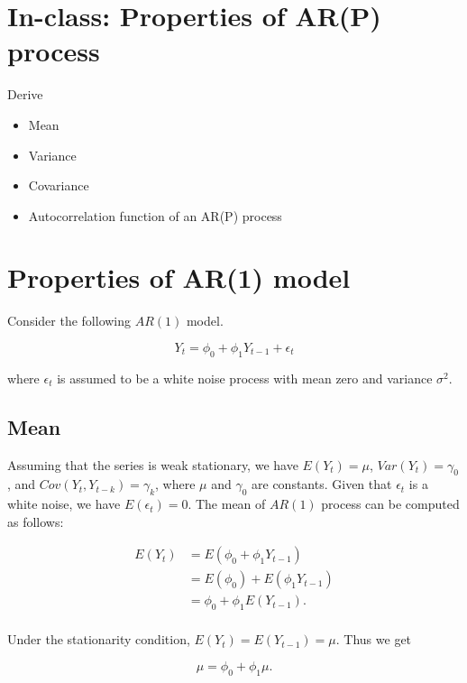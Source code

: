 \documentclass[
  11pt,
  a4paper,
]{report}
\begin{document}
\section{In-class: Properties of AR(P)
process}\label{in-class-properties-of-arp-process}

Derive

\begin{itemize}
\item
  Mean
\item
  Variance
\item
  Covariance
\item
  Autocorrelation function of an AR(P) process
\end{itemize}

\section{Properties of AR(1) model}\label{properties-of-ar1-model}

Consider the following \(AR(1)\) model.

\begin{equation}
Y_t=\phi_0+\phi_1Y_{t-1}+\epsilon_{t}
\end{equation}

where \({\epsilon_t}\) is assumed to be a white noise process with mean
zero and variance \(\sigma^2\).

\subsection{Mean}\label{mean}

Assuming that the series is weak stationary, we have \(E(Y_t)=\mu\),
\(Var(Y_t)=\gamma_0\), and \(Cov(Y_t, Y_{t-k})=\gamma_k\), where \(\mu\)
and \(\gamma_0\) are constants. Given that \({\epsilon_t}\) is a white
noise, we have \(E(\epsilon_t)=0\). The mean of \(AR(1)\) process can be
computed as follows:

\[
\begin{aligned}
  E(Y_t) &= E(\phi_0+\phi_1 Y_{t-1}) \\
         &= E(\phi_0) +E(\phi_1 Y_{t-1}) \\
         &= \phi_0 +\phi_1 E(Y_{t-1}). \\
\end{aligned}
\]

Under the stationarity condition, \(E(Y_t)=E(Y_{t-1})=\mu\). Thus we get

\[\mu = \phi_0+\phi_1\mu.\]
\end{document}
